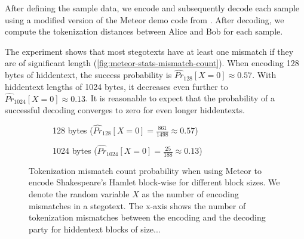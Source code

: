 After defining the sample data, we encode and subsequently decode each sample using a modified version of the Meteor demo code from \cite{MeteorDemo2021}.
After decoding, we compute the tokenization distances between Alice and Bob for each sample.

The experiment shows that most stegotexts have at least one mismatch if they are of significant length (\autoref{fig:meteor-stats-mismatch-count}).
When encoding 128 bytes of hiddentext, the success probability is $\hat{Pr}_{128}[X=0] \approx 0.57$.
With hiddentext lengths of 1024 bytes, it decreases even further to $\hat{Pr}_{1024}[X=0] \approx 0.13$.
It is reasonable to expect that the probability of a successful decoding converges to zero for even longer hiddentexts.

\begin{figure}[htbp]%
  \begin{subfigure}{.5\textwidth}%
    \centering%
      \resizebox{0.9\linewidth}{!}{%
    }%
    \caption{128 bytes ($\hat{Pr}_{128}[X=0] = \frac{861}{1498} \approx 0.57$)}%
  \end{subfigure}%
  \begin{subfigure}{.5\textwidth}%
    \centering%
      \resizebox{0.9\linewidth}{!}{%
    }%
    \caption{1024 bytes ($\hat{Pr}_{1024}[X=0] = \frac{25}{188} \approx 0.13$)}%
  \end{subfigure}%
  \caption{
  Tokenization mismatch count probability when using Meteor to encode Shakespeare's Hamlet block-wise for different block sizes.
  We denote the random variable $X$ as the number of encoding mismatches in a stegotext.
  The x-axis shows the number of tokenization mismatches between the encoding and the decoding party for hiddentext blocks of size...}
  \label{fig:meteor-stats-mismatch-count} 
\end{figure}


